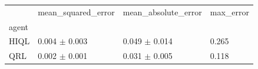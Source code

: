\begin{tabular}{llll}
\toprule
 & mean_squared_error & mean_absolute_error & max_error \\
agent &  &  &  \\
\midrule
HIQL & 0.004 $\pm$ 0.003 & 0.049 $\pm$ 0.014 & 0.265 \\
QRL & 0.002 $\pm$ 0.001 & 0.031 $\pm$ 0.005 & 0.118 \\
\bottomrule
\end{tabular}
